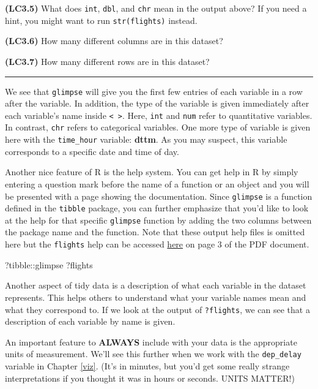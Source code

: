 \documentclass[]{tufte-book}
\newenvironment{Shaded}{\begin{snugshade}}{\end{snugshade}}
\newcommand{\NormalTok}[1]{{#1}}
\let\oldrule=\rule
\renewcommand{\rule}[1]{\oldrule{\linewidth}}
\theoremstyle{definition}
\theoremstyle{definition}
\theoremstyle{remark}
\begin{document}
\textbf{(LC3.5)} What does \texttt{int}, \texttt{dbl}, and \texttt{chr}
mean in the output above? If you need a hint, you might want to run
\texttt{str(flights)} instead.

\textbf{(LC3.6)} How many different columns are in this dataset?

\textbf{(LC3.7)} How many different rows are in this dataset?

\begin{center}\rule{0.5\linewidth}{\linethickness}\end{center}

We see that \texttt{glimpse} will give you the first few entries of each
variable in a row after the variable. In addition, the type of the
variable is given immediately after each variable's name inside
\texttt{\textless{}\ \textgreater{}}. Here, \texttt{int} and
\texttt{num} refer to quantitative variables. In contrast, \texttt{chr}
refers to categorical variables. One more type of variable is given here
with the \texttt{time\_hour} variable: \textbf{dttm}. As you may
suspect, this variable corresponds to a specific date and time of day.

Another nice feature of R is the help system. You can get help in R by
simply entering a question mark before the name of a function or an
object and you will be presented with a page showing the documentation.
Since \texttt{glimpse} is a function defined in the \texttt{tibble}
package, you can further emphasize that you'd like to look at the help
for that specific \texttt{glimpse} function by adding the two columns
between the package name and the function. Note that these output help
files is omitted here but the \texttt{flights} help can be accessed
\href{https://cran.r-project.org/web/packages/nycflights13/nycflights13.pdf}{here}
on page 3 of the PDF document.

\begin{Shaded}
\begin{Highlighting}[]
\NormalTok{?tibble::glimpse}
\NormalTok{?flights}
\end{Highlighting}
\end{Shaded}

Another aspect of tidy data is a description of what each variable in
the dataset represents. This helps others to understand what your
variable names mean and what they correspond to. If we look at the
output of \texttt{?flights}, we can see that a description of each
variable by name is given.

An important feature to \textbf{ALWAYS} include with your data is the
appropriate units of measurement. We'll see this further when we work
with the \texttt{dep\_delay} variable in Chapter \ref{viz}. (It's in
minutes, but you'd get some really strange interpretations if you
thought it was in hours or seconds. UNITS MATTER!)
\end{document}
